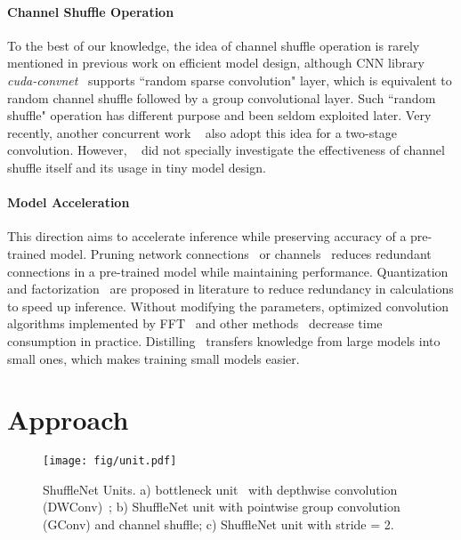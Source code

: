 \documentclass[10pt,twocolumn,letterpaper]{article}
\begin{document}
\paragraph{Channel Shuffle Operation}
To the best of our knowledge, the idea of channel shuffle operation is rarely mentioned in previous work on efficient model design, although CNN library \emph{cuda-convnet}~\cite{krizhevsky2012cuda} supports ``random sparse convolution" layer, which is equivalent to random channel shuffle followed by a group convolutional layer. Such ``random shuffle" operation has different purpose and been seldom exploited later. Very recently, another concurrent work ~\cite{zhang2017interleaved} also adopt this idea for a two-stage convolution. However, ~\cite{zhang2017interleaved} did not specially investigate the effectiveness of channel shuffle itself and its usage in tiny model design.

\paragraph{Model Acceleration} 
This direction aims to accelerate inference while preserving accuracy of a pre-trained model.
Pruning network connections~\cite{han2015deep, han2015learning} or channels~\cite{wen2016learning} reduces 
redundant connections in a pre-trained model while maintaining performance.
Quantization~\cite{soudry2014expectation, rastegari2016xnor, wu2016quantized, zhou2016dorefa, zhou2017incremental} and 
factorization~\cite{lebedev2014speeding, jaderberg2014speeding, jin2014flattened, wang2016factorized} are proposed in
literature to reduce redundancy in calculations to speed up inference.
Without modifying the parameters, optimized convolution algorithms implemented by FFT~\cite{mathieu2013fast,vasilache2014fast} and other methods~\cite{bagherinezhad2016lcnn} decrease time consumption in practice.
Distilling~\cite{hinton2015distilling} transfers knowledge from
large models into small ones, which makes training small models easier. 

\section{Approach}

\begin{figure*}[ht]
	\centering
	\texttt{[image: fig/unit.pdf]}
	\caption{ShuffleNet Units. a) bottleneck unit~\cite{he2016deep} with depthwise convolution (DWConv)~\cite{chollet2016xception,howard2017mobilenets}; b) ShuffleNet unit with pointwise group convolution (GConv) and channel shuffle; c) ShuffleNet unit with stride = 2.}
	\label{fig:unit}
\end{figure*}
\end{document}

